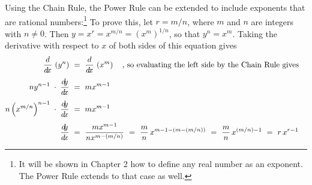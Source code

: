 Using the Chain Rule, the Power Rule can be extended to include exponents that
are rational numbers:\footnote{It will be shown in Chapter 2 how to define any
real number as an exponent. The Power Rule extends to that case as well.}
To prove this, let $r = m/n$, where $m$ and $n$ are integers with $n \ne 0$.
Then $y = x^r = x^{m/n} = \left(x^m\right)^{1/n}$, so that $y^n = x^m$. Taking
the derivative with respect to $x$ of both sides of this equation gives
\begin{align*}
 \ddx\,\left(y^n\right) ~&=~ \ddx\,\left(x^m\right) \quad\text{, so evaluating the
                              left side by the Chain Rule gives}\\[4pt]
 n y^{n-1} \;\cdot\; \dydx ~&=~ m x^{m-1}\\[4pt]
 n \left(x^{m/n}\right)^{n-1} \;\cdot\; \dydx ~&=~ m x^{m-1}\\[4pt]
 \dydx ~&=~ \frac{m x^{m-1}}{n x^{m - (m/n)}} ~=~
            \frac{m}{n}\,x^{m - 1 - (m - (m/n))} ~=~ \frac{m}{n}\,x^{(m/n) - 1} ~=~
            r\,x^{r-1} \quad\checkmark
\end{align*}

